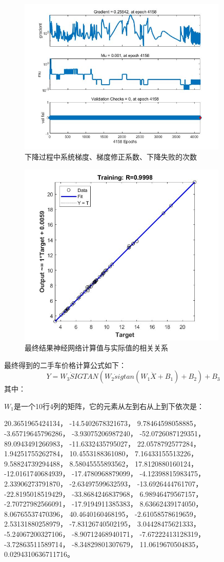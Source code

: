 \documentclass{ctexart}
\begin{document}
\renewcommand\figurename{图}
\begin{figure}[H]
	\centering
	\includegraphics[width=10cm]{c.jpg}
	\caption{下降过程中系统梯度、梯度修正系数、下降失败的次数} \label{all}
\end{figure}

\renewcommand\figurename{图}
\begin{figure}[H]
	\centering
	\includegraphics[width=10cm]{d.jpg}
	\caption{最终结果神经网络计算值与实际值的相关关系} \label{all}
\end{figure}

最终得到的二手车价格计算公式如下：
\begin{equation}
	Y=W_3 \dot SIGTAN(W_2 \dot sigtan(W_1 \dot X+B_1)+B_2)+B_3
\end{equation}
其中：

$W_1$是一个10行4列的矩阵，它的元素从左到右从上到下依次是： \cite{姜启源-数学模型}

20.3651965424134，	-14.5402678321673，	9.78464598058885，	-3.65719645796286，
-3.93075206987240，	-52.0726087129351，	89.0943491266983，	-11.6332435795027，
22.0578792577284，	1.94251755262784，	10.4553188361080，	7.16433155513226，
9.58824739294488，	8.58045555893562，	17.8120880160124，	-12.0161740684939，
-17.4780968879099，	-4.12398815983475，	2.33906273791870，	-2.63497599632593，
-13.6926444761707，	-22.8195018519429，	-33.8684246837968，	6.98946479567157，
-2.70727982566091，	-17.9194911385383，	8.63662439174050，	8.06765537470396，
40.4640160468195，	-2.61058578619659，	2.53131880258979，	-7.83126740502195，
3.04428475621333，	-5.24067200327106，	-8.90712468940171，	-7.67222413128319，
-3.72863511589714，	-8.34829801307679，	11.0619670504835，	0.0294310636711716。
\end{document}

